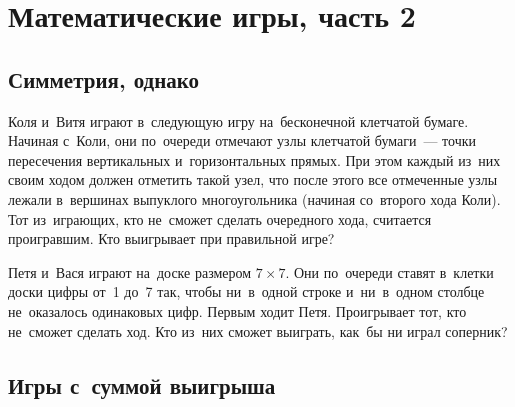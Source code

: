 

\section*{Математические игры, часть 2}



\subsection*{Симметрия, однако}

\begin{problems}

\item
Коля и~Витя играют в~следующую игру на~бесконечной клетчатой бумаге.
Начиная с~Коли, они по~очереди отмечают узлы клетчатой бумаги~--- точки
пересечения вертикальных и~горизонтальных прямых.
При этом каждый из~них своим ходом должен отметить такой узел, что после этого
все отмеченные узлы лежали в~вершинах выпуклого многоугольника
(начиная со~второго хода Коли).
Тот из~играющих, кто не~сможет сделать очередного хода, считается проигравшим.
Кто выигрывает при правильной игре? 

\item
Петя и~Вася играют на~доске размером $7 \times 7$.
Они по~очереди ставят в~клетки доски цифры от~1 до~7 так, чтобы ни~в~одной
строке и~ни~в~одном столбце не~оказалось одинаковых цифр.
Первым ходит Петя.
Проигрывает тот, кто не~сможет сделать ход.
Кто из~них сможет выиграть, как~бы ни играл соперник?

\end{problems}

\subsection*{Игры с~суммой выигрыша}

